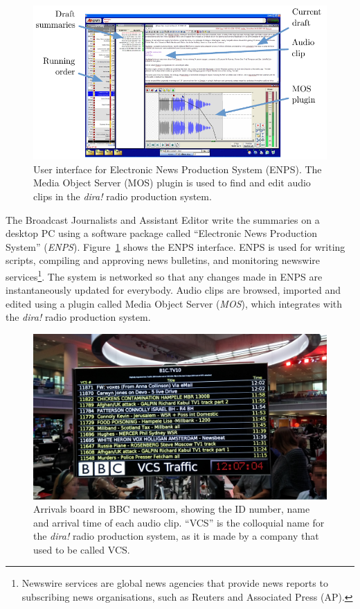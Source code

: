 \begin{figure}
  \centering
  \includegraphics[width=\columnwidth]{figs/news-enps-labelled.pdf}
  \caption{User interface for Electronic News Production System (ENPS). The Media Object Server (MOS) plugin is used to
  find and edit audio clips in the \textit{dira!} radio production system.}
  \label{fig:news-enps-edit}
\end{figure}

The Broadcast Journalists and Assistant Editor write the summaries on a desktop PC using a software package called
``Electronic News Production System'' (\textit{ENPS}). Figure~\ref{fig:news-enps-edit} shows the ENPS interface. ENPS
is used for writing scripts, compiling and approving news bulletins, and monitoring newswire services\footnote{Newswire
services are global news agencies that provide news reports to subscribing news organisations, such as Reuters and
Associated Press (AP).}. The system is networked so that any changes made in ENPS are instantaneously updated for
everybody. Audio clips are browsed, imported and edited using a plugin called Media Object Server (\textit{MOS}), which
integrates with the \textit{dira!} radio production system.

\begin{figure}
  \centering
  \includegraphics[width=\columnwidth]{figs/news-intake-pixelated.jpg}
  \caption[Arrivals board in the BBC newsroom.]{Arrivals board in BBC newsroom, showing the ID number, name and arrival
  time of each audio clip.  ``VCS'' is the colloquial name for the \textit{dira!} radio production system, as it is
  made by a company that used to be called VCS.}
  \label{fig:news-arrivals}
\end{figure}

